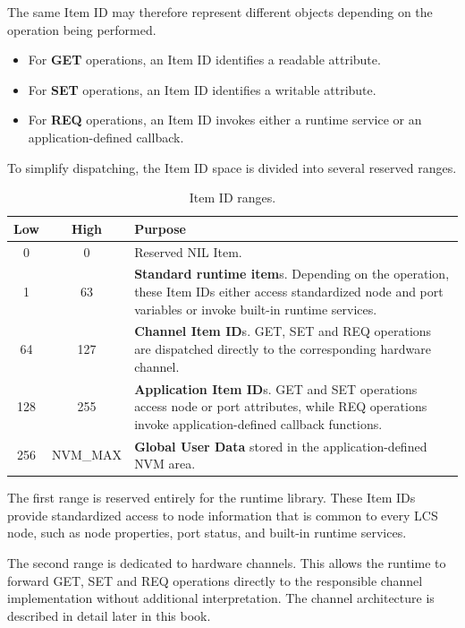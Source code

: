The same Item ID may therefore represent different objects depending on the 
operation being performed.

\begin{itemize}
    \item For \textbf{GET} operations, an Item ID identifies a readable attribute.
    \item For \textbf{SET} operations, an Item ID identifies a writable attribute.
    \item For \textbf{REQ} operations, an Item ID invokes either a runtime service 
     or an application-defined callback.
\end{itemize}

To simplify dispatching, the Item ID space is divided into several reserved ranges.

\begin{table}[!ht]
\begin{center}
\begin{tabularx}{0.9\textwidth}{|c|c|X|}
\hline
\textbf{Low} & \textbf{High} & \textbf{Purpose} \\
\hline
0 & 0 &
Reserved NIL Item.\\
\hline
1 & 63 &
\textbf{Standard runtime item}s. Depending on the operation, these Item IDs either access 
standardized node and port variables or invoke built-in runtime services.\\
\hline
64 & 127 &
\textbf{Channel Item ID}s. GET, SET and REQ operations are dispatched directly to the
corresponding hardware channel.\\
\hline
128 & 255 &
\textbf{Application Item ID}s. GET and SET operations access node or port attributes, 
while REQ operations invoke application-defined callback functions.\\
\hline
256 & NVM\_MAX &
\textbf{Global User Data} stored in the application-defined NVM area.\\
\hline
\end{tabularx}
\end{center}
\caption{Item ID ranges.}
\end{table}

\FloatBarrier

The first range is reserved entirely for the runtime library. These Item IDs 
provide standardized access to node information that is common to every LCS node, 
such as node properties, port status, and built-in runtime services.

The second range is dedicated to hardware channels. This allows the runtime to 
forward GET, SET and REQ operations directly to the responsible channel 
implementation without additional interpretation. The channel architecture is 
described in detail later in this book.

